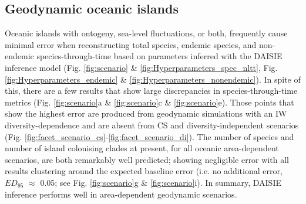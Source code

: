 \documentclass{article}
\begin{document}
\subsection*{Geodynamic oceanic islands}

Oceanic islands with ontogeny, sea-level fluctuations, or both, frequently cause minimal error when reconstructing total species, endemic species, and non-endemic species-through-time based on parameters inferred with the DAISIE inference model (Fig. \ref{fig:scenario} \& \ref{fig:Hyperparameters_spec_nltt}, Fig. \ref{fig:Hyperparameters_endemic} \& \ref{fig:Hyperparameters_nonendemic}). In spite of this, there are a few results that show large discrepancies in species-through-time metrics (Fig. \ref{fig:scenario}a \& \ref{fig:scenario}c \& \ref{fig:scenario}e). Those points that show the highest error are produced from geodynamic simulations with an IW diversity-dependence and are absent from CS and diversity-independent scenarios (Fig. \ref{fig:facet_scenario_cs}-\ref{fig:facet_scenario_di}). The number of species and number of island colonising clades at present, for all oceanic area-dependent scenarios, are both remarkably well predicted; showing negligible error with all results clustering around the expected baseline error (i.e. no additional error, $ED_{95}$ $\approx$ 0.05; see Fig. \ref{fig:scenario}g \& \ref{fig:scenario}i). In summary, DAISIE inference performs well in area-dependent geodynamic scenarios. \\
\end{document}
